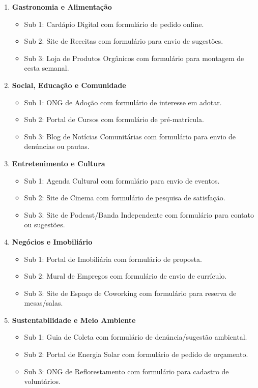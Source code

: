 \documentclass[12pt,a4paper]{article}
\begin{document}
\begin{enumerate}[label=\textbf{Tema \arabic*:}, leftmargin=2cm]
    \item \textbf{Gastronomia e Alimentação}
    \begin{itemize}
        \item Sub 1: Cardápio Digital com formulário de pedido online.
        \item Sub 2: Site de Receitas com formulário para envio de sugestões.
        \item Sub 3: Loja de Produtos Orgânicos com formulário para montagem de cesta semanal.
    \end{itemize}

    \item \textbf{Social, Educação e Comunidade}
    \begin{itemize}
        \item Sub 1: ONG de Adoção com formulário de interesse em adotar.
        \item Sub 2: Portal de Cursos com formulário de pré-matrícula.
        \item Sub 3: Blog de Notícias Comunitárias com formulário para envio de denúncias ou pautas.
    \end{itemize}

    \item \textbf{Entretenimento e Cultura}
    \begin{itemize}
        \item Sub 1: Agenda Cultural com formulário para envio de eventos.
        \item Sub 2: Site de Cinema com formulário de pesquisa de satisfação.
        \item Sub 3: Site de Podcast/Banda Independente com formulário para contato ou sugestões.
    \end{itemize}

    \item \textbf{Negócios e Imobiliário}
    \begin{itemize}
        \item Sub 1: Portal de Imobiliária com formulário de proposta.
        \item Sub 2: Mural de Empregos com formulário de envio de currículo.
        \item Sub 3: Site de Espaço de Coworking com formulário para reserva de mesas/salas.
    \end{itemize}

    \item \textbf{Sustentabilidade e Meio Ambiente}
    \begin{itemize}
        \item Sub 1: Guia de Coleta com formulário de denúncia/sugestão ambiental.
        \item Sub 2: Portal de Energia Solar com formulário de pedido de orçamento.
        \item Sub 3: ONG de Reflorestamento com formulário para cadastro de voluntários.
    \end{itemize}
\end{enumerate}
\end{document}
